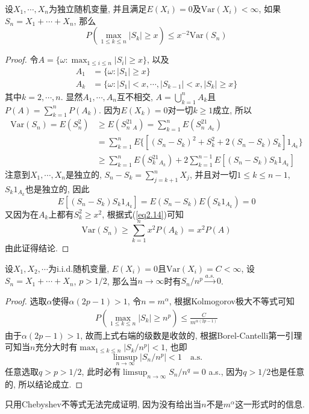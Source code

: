 \documentclass[cn, 12pt, math=mtpro2, bibstyle=apa, blue, twocol]{elegantbook}
\begin{document}
\begin{theorem}[Kolmogorov极大不等式]
  设$X_1,\cdots,X_n$为独立随机变量, 并且满足$E(X_i)=0$及$\text{Var}(X_i)<\infty$, 如果$S_n=X_1+\cdots+X_n$, 那么
  $$P\left(\max_{1\leq k\leq n}|S_k|\geq x\right)\leq x^{-2}\text{Var}(S_n)$$
\end{theorem}
\begin{proof}
  令$A=\{\omega: \max_{1\leq i\leq n}|S_i|\geq x\}$, 以及
  \begin{align*}
  A_1&=\{\omega: |S_1|\geq x\} \\
  A_k&=\{\omega: |S_1|<x,\cdots,|S_{k-1}|<x, |S_k|\geq x\}
  \end{align*}
  其中$k=2,\cdots,n$. 显然$A_1,\cdots,A_n$互不相交, $A=\bigcup_{k=1}^nA_k$且$P(A)=\sum_{k=1}^{n}P(A_k)$. 因为$E(X_k)=0$对一切$k\ge1$成立, 所以
  \begin{align}
  \text{Var}(S_n)=E(S_n^2)&\geq E(S_n^21_A)=\sum_{k=1}^{n}E(S_n^21_{A_k}) \nonumber \\
  &=\sum_{k=1}^{n}E\{[(S_n-S_k)^2+S_k^2+2(S_n-S_k)S_k]1_{A_k}\} \nonumber \\
  &\geq \sum_{k=1}^{n}E(S_k^21_{A_k})+2\sum_{k=1}^{n-1}E[(S_n-S_k)S_k1_{A_k}] \label{eq2.14}
  \end{align}
  注意到$X_1,\cdots,X_n$是独立的, $S_n-S_k=\sum_{j=k+1}^{n}X_j$, 并且对一切$1\leq k\leq n-1$, $S_k1_{A_k}$也是独立的, 因此
  $$E[(S_n-S_k)S_k1_{A_k}]=E(S_n-S_k)E(S_k1_{A_k})=0$$
  又因为在$A_k$上都有$S_k^2\geq x^2$, 根据式(\ref{eq2.14})可知
  $$\text{Var}(S_n)\geq\sum_{k=1}^{n}x^2P(A_k)=x^2P(A)$$
  由此证得结论.
\end{proof}

\begin{example}
设$X_1,X_2,\cdots$为i.i.d.随机变量, $E(X_i)=0$且$\text{Var}(X_i)=C<\infty$, 设$S_n=X_1+\cdots+X_n$, $p>1/2$, 那么当$n\to\infty$时有$S_n/n^p\xrightarrow{a.s.} 0$.
\end{example}
\begin{proof}
  选取$\alpha$使得$\alpha(2p-1)>1$, 令$n=m^\alpha$, 根据Kolmogorov极大不等式可知
  \begin{align*}
  P\left(\max_{1\leq k\leq n}|S_k|\geq n^p \right)\leq \frac{C}{m^{\alpha(2p-1)}}
  \end{align*}
  由于$\alpha(2p-1)>1$, 故而上式右端的级数是收敛的, 根据Borel-Cantelli第一引理可知当$n$充分大时有$\max_{1\leq k\leq n}|S_k/n^p|<1$, 也即
  $$\limsup_{n\to\infty} |S_n/n^p|<1\quad \text{a.s.}$$
  任意选取$q>p>1/2$, 此时必有$\limsup_{n\to\infty} S_n/n^q=0$ a.s., 因为$q>1/2$也是任意的, 所以结论成立.
\end{proof}
\begin{remark}
只用Chebyshev不等式无法完成证明, 因为没有给出当$n$不是$m^\alpha$这一形式时的信息.
\end{remark}
\end{document}

